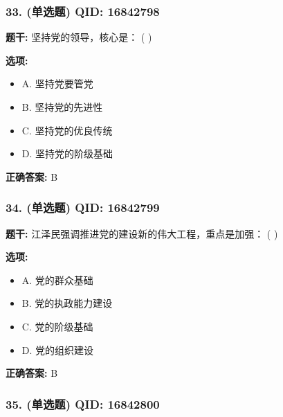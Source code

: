 \documentclass[12pt,UTF8]{ctexart}
\begin{document}
\subsubsection*{33. (单选题) \small QID: 16842798}

\textbf{题干:}
坚持党的领导，核心是： ( )

\textbf{选项:}
\begin{itemize}[leftmargin=*]

  \item A. 坚持党要管党

  \item B. 坚持党的先进性

  \item C. 坚持党的优良传统

  \item D. 坚持党的阶级基础

\end{itemize}

\textbf{正确答案:}
B

\vspace{0.3em}\hrulefill\vspace{0.7em}

\subsubsection*{34. (单选题) \small QID: 16842799}

\textbf{题干:}
江泽民强调推进党的建设新的伟大工程，重点是加强： ( )

\textbf{选项:}
\begin{itemize}[leftmargin=*]

  \item A. 党的群众基础

  \item B. 党的执政能力建设

  \item C. 党的阶级基础

  \item D. 党的组织建设

\end{itemize}

\textbf{正确答案:}
B

\vspace{0.3em}\hrulefill\vspace{0.7em}

\subsubsection*{35. (单选题) \small QID: 16842800}
\end{document}
